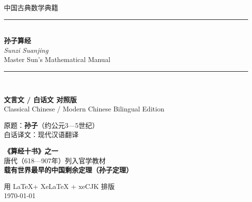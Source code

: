 \documentclass[11pt,a4paper]{article}
\newcommand{\longline}{\noindent\rule{\textwidth}{0.4pt}}
\begin{document}
\begin{titlepage}
\begin{center}
\vspace*{1.5cm}

{\fontsize{12}{14}\selectfont\textsc{中国古典数学典籍}}\\[0.5cm]

\longline\\[1cm]

{\fontsize{32}{38}\selectfont\bfseries\color{titlecolor}
孙子算经}\\[0.6cm]

{\fontsize{20}{24}\selectfont\itshape Sunzi Suanjing}\\[0.4cm]

{\fontsize{14}{18}\selectfont Master Sun's Mathematical Manual}\\[1cm]

\longline\\[1cm]

\begin{tcolorbox}[colback=chinesebg,colframe=rulecolor,boxrule=1pt,
  width=0.9\textwidth,arc=3mm]
\centering
\large
\textbf{文言文 / 白话文 对照版}\\[4pt]
\normalsize
Classical Chinese / Modern Chinese Bilingual Edition
\end{tcolorbox}

\vspace{1cm}

{\large 原题：\textbf{孙子}（约公元3—5世纪）}\\[0.3cm]
{\normalsize 白话译文：现代汉语翻译}\\[1.5cm]

\begin{tcolorbox}[colback=chinesebg,colframe=rulecolor,boxrule=0.8pt,
  width=0.85\textwidth,arc=2mm]
\centering
\small
\textbf{《算经十书》之一}\\[3pt]
唐代（618—907年）列入官学教材\\[3pt]
\textbf{载有世界最早的中国剩余定理（孙子定理）}
\end{tcolorbox}

\vfill

{\small 用 \LaTeX + XeLaTeX + xeCJK 排版}\\[0.3cm]
{\small\today}

\end{center}
\end{titlepage}
\end{document}
